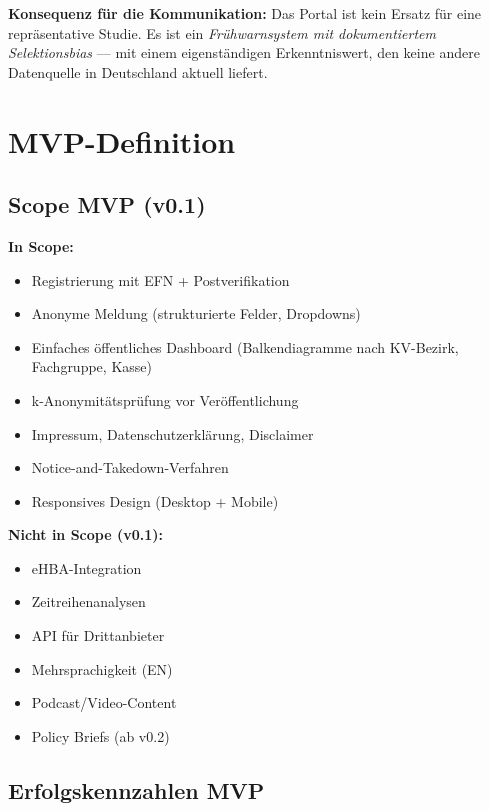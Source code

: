 \documentclass{umbruch-position}
\begin{document}
\textbf{Konsequenz für die Kommunikation:} Das Portal ist kein Ersatz für eine repräsentative Studie. Es ist ein \emph{Frühwarnsystem mit dokumentiertem Selektionsbias} --- mit einem eigenständigen Erkenntniswert, den keine andere Datenquelle in Deutschland aktuell liefert.


\section{MVP-Definition}

\subsection{Scope MVP (v0.1)}

\textbf{In Scope:}
\begin{itemize}[nosep]
  \item [{[x]}] Registrierung mit EFN + Postverifikation
  \item [{[x]}] Anonyme Meldung (strukturierte Felder, Dropdowns)
  \item [{[x]}] Einfaches öffentliches Dashboard (Balkendiagramme nach KV-Bezirk, Fachgruppe, Kasse)
  \item [{[x]}] k-Anonymitätsprüfung vor Veröffentlichung
  \item [{[x]}] Impressum, Datenschutzerklärung, Disclaimer
  \item [{[x]}] Notice-and-Takedown-Verfahren
  \item [{[x]}] Responsives Design (Desktop + Mobile)
\end{itemize}

\textbf{Nicht in Scope (v0.1):}
\begin{itemize}[nosep]
  \item [{[ ]}] eHBA-Integration
  \item [{[ ]}] Zeitreihenanalysen
  \item [{[ ]}] API für Drittanbieter
  \item [{[ ]}] Mehrsprachigkeit (EN)
  \item [{[ ]}] Podcast/Video-Content
  \item [{[ ]}] Policy Briefs (ab v0.2)
\end{itemize}

\subsection{Erfolgskennzahlen MVP}
\end{document}
